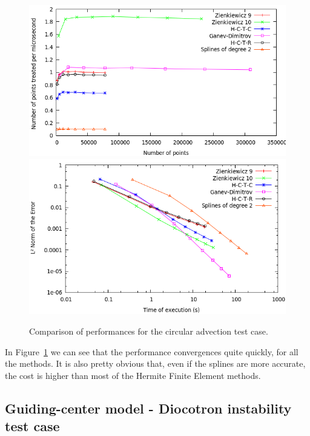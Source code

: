 \documentclass[proc]{edpsmath}
\newcommand{\blue}[1]{\textcolor{blue}{#1}}
\begin{document}
\begin{figure}[h!]
	\includegraphics[scale=0.35]{figures/efficiency.png}
	\includegraphics[scale=0.35]{figures/time_norm.png}
	\caption{ Comparison of performances for the circular advection test case.
	}
	\label{fig:circ_performance}
\end{figure}

In Figure~\ref{fig:circ_performance} we can see that the performance convergences quite quickly, for all the methods. It is also pretty obvious that, even if the splines are more accurate, the cost is higher than most of the Hermite Finite Element methods. %

\subsection{Guiding-center model - Diocotron instability test case}
\end{document}

